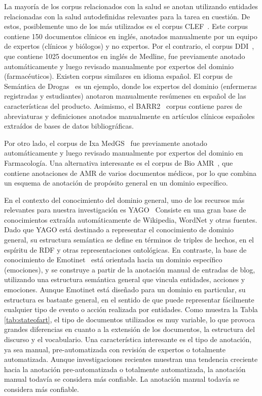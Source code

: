 La mayoría de los corpus relacionados con la salud se anotan utilizando entidades relacionadas con la salud autodefinidas relevantes para la tarea en cuestión. De estos, posiblemente uno de los más utilizados es el corpus CLEF~\cite{kelly2016overview}. Este corpus contiene 150 documentos clínicos en inglés, anotados manualmente por un equipo de expertos (clínicos y biólogos) y no expertos. Por el contrario, el corpus DDI~\cite{herrero2013ddi}, que contiene 1025 documentos en inglés de Medline, fue previamente anotado automáticamente y luego revisado manualmente por expertos del dominio (farmacéuticos). Existen corpus similares en idioma español. El corpus de Semántica de Drogas~\cite{moreno2017drugsemantics} es un ejemplo, donde los expertos del dominio (enfermeras registradas y estudiantes) anotaron manualmente resúmenes en español de las características del producto. {Asimismo, el BARR2}~\cite{barr2} {corpus contiene pares de abreviaturas y definiciones anotados manualmente en artículos clínicos españoles extraídos de bases de datos bibliográficas.}

Por otro lado, el corpus de Ixa MedGS~\cite{oronoz2015creation} fue previamente anotado automáticamente y luego revisado manualmente por expertos del dominio en Farmacología. Una alternativa interesante es el corpus de Bio AMR~\cite{bioamr, bioamrpaper}, que contiene anotaciones de AMR de varios documentos médicos, por lo que combina un esquema de anotación de propósito general en un dominio específico.

En el contexto del conocimiento del dominio general, uno de los recursos más relevantes para nuestra investigación es YAGO~\cite{suchanek2007yago}
Consiste en una gran base de conocimientos extraída automáticamente de Wikipedia, WordNet y otras fuentes. Dado que YAGO está destinado a representar el conocimiento de dominio general, su estructura semántica se define en términos de triples de hechos, en el espíritu de RDF y otras representaciones ontológicas.
En contraste, la base de conocimiento de Emotinet~\cite{Balahur2011} está orientada hacia un dominio específico (emociones), y se construye a partir de la anotación manual de entradas de blog, utilizando una estructura semántica general que vincula entidades, acciones y emociones.
Aunque Emotinet está diseñado para un dominio en particular, su estructura es bastante general, en el sentido de que puede representar fácilmente cualquier tipo de evento o acción realizada por entidades. Como muestra la Tabla \ref{tab:stateofart}, el tipo de documentos utilizados es muy variable, lo que provoca grandes diferencias en cuanto a la extensión de los documentos, la estructura del discurso y el vocabulario. Una característica interesante es el tipo de anotación, ya sea manual, pre-automatizada con revisión de expertos o totalmente automatizada. Aunque investigaciones recientes muestran una tendencia creciente hacia la anotación pre-automatizada o totalmente automatizada, la anotación manual todavía se considera más confiable. La anotación manual todavía se considera más confiable.

